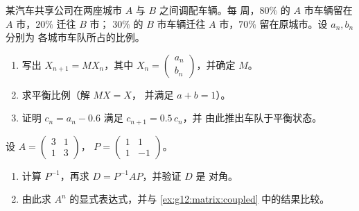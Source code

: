 \begin{exercise}[$\star\star$]\label{exo:g12:matrix:7}
某汽车共享公司在两座城市 $A$ 与 $B$ 之间调配车辆。每
周，$80\%$ 的 $A$ 市车辆留在 $A$ 市，$20\%$ 迁往 $B$ 市；
$30\%$ 的 $B$ 市车辆迁往 $A$ 市，$70\%$ 留在原城市。设 $a_n, b_n$ 分别为
各城市车队所占的比例。
\begin{omfigure}
\end{omfigure}
\begin{enumerate}
  \item 写出 $X_{n+1} = MX_n$，其中
        $X_n = \begin{pmatrix} a_n\\ b_n\end{pmatrix}$，并确定 $M$。
  \item 求平衡比例（解 $MX = X$，
        并满足 $a + b = 1$）。
  \item 证明 $c_n = a_n - 0.6$ 满足 $c_{n+1} = 0.5\,c_n$，并
        由此推出车队于平衡状态。
\end{enumerate}
\end{exercise}

\begin{exercise}[$\star\star\star$]\label{exo:g12:matrix:8}
设 $A = \begin{pmatrix} 3 & 1\\ 1 & 3 \end{pmatrix}$，
$P = \begin{pmatrix} 1 & 1\\ 1 & -1 \end{pmatrix}$。
\begin{enumerate}
  \item 计算 $P^{-1}$，再求 $D = P^{-1}AP$，并验证 $D$ 是
        对角。
  \item 由此求 $A^n$ 的显式表达式，并与
        \cref{ex:g12:matrix:coupled} 中的结果比较。
\end{enumerate}
\end{exercise}

